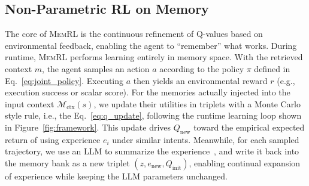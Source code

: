 \documentclass{article}
\theoremstyle{plain}
\theoremstyle{definition}
\theoremstyle{remark}
\begin{document}




\subsection{Non-Parametric RL on Memory}
\label{subsec:update}

The core of \textsc{MemRL} is the continuous refinement of Q-values based on environmental feedback, enabling the agent to ``remember'' what works. During runtime, \textsc{MemRL} performs learning entirely in memory space. With the retrieved context $m$, the agent samples an action $a$ according to the policy $\pi$ defined in Eq.~\ref{eq:joint_policy}. Executing $a$ then yields an environmental reward $r$ (e.g., execution success or scalar score). For the memories actually injected into the input context $\mathcal{M}_{\text{ctx}}(s)$, we update their utilities in triplets with a Monte Carlo style rule, i.e., the Eq.~\ref{eq:q_update}, following the runtime learning loop shown in Figure~\ref{fig:framework}. 
This update drives $Q_{\text{new}}$ toward the empirical expected return of using experience $e_i$ under similar intents. Meanwhile, for each sampled trajectory, we use an LLM to summarize the experience~\citep{fang2025memp}, and write it back into the memory bank as a new triplet $(z, e_{\text{new}}, Q_{\text{init}})$, enabling continual expansion of experience while keeping the LLM parameters unchanged.
\end{document}
